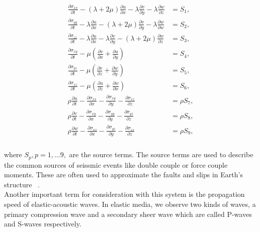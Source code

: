 \begin{align}
    \begin{split}
    \frac{\partial \sigma_{xx}}{\partial t} - \left(\lambda  + 2\mu\right)\frac{\partial u}{\partial x} - \lambda \frac{\partial v}{\partial y} - \lambda\frac{\partial w}{\partial z} &= S_1, \\    
    \frac{\partial \sigma_{yy}}{\partial t} - \lambda \frac{\partial u}{\partial x} - \left( \lambda + 2 \mu \right)\frac{\partial v}{\partial y} - \lambda \frac{\partial w}{\partial w} &= S_2, \\
    \frac{\partial \sigma_{zz}}{\partial t} - \lambda \frac{\partial u}{\partial x} - \lambda \frac{\partial v}{\partial y} - \left(\lambda + 2\mu\right)\frac{\partial w}{\partial z} &= S_3, \\
    \frac{\partial \sigma_{xy}}{\partial t} - \mu \left(\frac{\partial v}{\partial x} + \frac{\partial u}{\partial y}\right) &= S_4, \\ 
    \frac{\partial \sigma_{yz}}{\partial t} - \mu \left(\frac{\partial v}{\partial z} + \frac{\partial w}{\partial y}\right) &= S_5, \\
    \frac{\partial \sigma_{xz}}{\partial t} - \mu \left(\frac{\partial u}{\partial z} + \frac{\partial w}{\partial x}\right) &= S_6, \\
    \rho \frac{\partial u}{\partial t} - \frac{\partial \sigma_{xx}}{\partial x} - \frac{\partial \sigma_{xy}}{\partial y} - \frac{\partial \sigma_{xz}}{\partial z} &= \rho S_7, \\
    \rho \frac{\partial v}{\partial t} - \frac{\partial \sigma_{xy}}{\partial x} - \frac{\partial \sigma_{yy}}{\partial y} - \frac{\partial \sigma_{yz}}{\partial z} &= \rho S_8, \\
    \rho \frac{\partial w}{\partial t} - \frac{\partial \sigma_{xz}}{\partial x} - \frac{\partial \sigma_{yz}}{\partial y} - \frac{\partial \sigma_{zz}}{\partial z} &= \rho S_9, \\
\end{split}
\label{eq:setofequations}
\end{align}

where $S_p, p = 1,\dots9,$ are the source terms. The source terms are used to describe the common sources of seissmic events like double couple or force couple moments.
These are often used to approximate the faults and slips in Earth's structure ~\parencite{shearer_2019}.\\

Another important term for consideration with this system is the propagation speed of elastic-acoustic waves. In elastic media, we 
observe two kinds of waves, a primary compression wave and a secondary sheer wave which are called P-waves and S-waves respectively.\\


